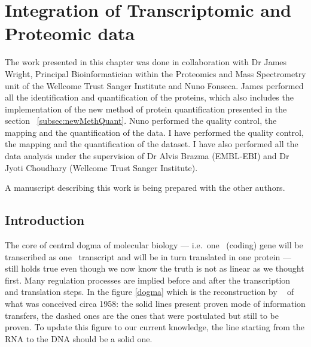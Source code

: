 \clearpage
\chapter{Integration of Transcriptomic and Proteomic data}

The work presented in this chapter was done in collaboration with Dr James Wright,
Principal Bioinformatician within the Proteomics and Mass Spectrometry unit of the
Wellcome Trust Sanger Institute and Nuno Fonseca. James performed all the
identification and quantification of the proteins, which also includes the
implementation of the new method of protein quantification presented in the
section ~\ref{subsec:newMethQuant}. Nuno performed the quality control, the mapping
and the quantification of the  data. I have performed the quality control,
the mapping and the quantification of the  dataset. I have also performed
all the data analysis under the supervision of Dr Alvis Brazma (EMBL-EBI) and
Dr Jyoti Choudhary (Wellcome Trust Sanger Institute).

A manuscript describing this work is being prepared with the other authors.

\section{Introduction}
\begin{comment}

    here should be explain all the reasons and the challenging of why this is
    important.
    Here some of the reasons: transcriptomics and proteomics are not the same
    range (technology bias)
    It is hard to say when it is NOT correlated if this comes from a
    technical problem or regulation.

    Workflows a lot better established in transcriptomics than proteomics
    (annotation, mapping)

\end{comment}

The core of central dogma of molecular biology --- i.e.\ one \DNA\ (coding) gene will
be transcribed as one \mRNA\ transcript and will be in turn translated in one
protein --- still holds true even though we now know the truth is not as linear as
we thought first. Many regulation processes are implied before
and after the transcription and translation steps.
In the figure \ref{dogma} which is the reconstruction by ~\cite{Crick:1958} of
what was conceived circa 1958: the solid lines present proven mode of information
transfers, the dashed ones are the ones that were postulated but still to be proven.
To update this figure to our current knowledge, the line starting from the RNA to
the DNA should be a solid one.


